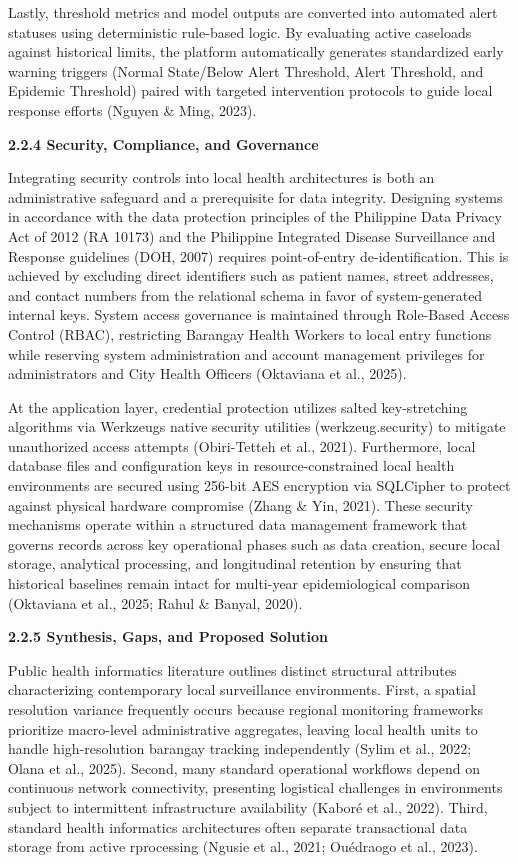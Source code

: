 \documentclass[
]{article}
\begin{document}
Lastly, threshold metrics and model outputs are converted into automated
alert statuses using deterministic rule-based logic. By evaluating
active caseloads against historical limits, the platform automatically
generates standardized early warning triggers (Normal State/Below Alert
Threshold, Alert Threshold, and Epidemic Threshold) paired with targeted
intervention protocols to guide local response efforts (Nguyen \& Ming,
2023).

\textbf{2.2.4 Security, Compliance, and Governance}

Integrating security controls into local health architectures is both an
administrative safeguard and a prerequisite for data integrity.
Designing systems in accordance with the data protection principles of
the Philippine Data Privacy Act of 2012 (RA 10173) and the Philippine
Integrated Disease Surveillance and Response guidelines (DOH, 2007)
requires point-of-entry de-identification. This is achieved by excluding
direct identifiers such as patient names, street addresses, and contact
numbers from the relational schema in favor of system-generated internal
keys. System access governance is maintained through Role-Based Access
Control (RBAC), restricting Barangay Health Workers to local entry
functions while reserving system administration and account management
privileges for administrators and City Health Officers (Oktaviana et
al., 2025).

At the application layer, credential protection utilizes salted
key-stretching algorithms via Werkzeug\textquotesingle s native security
utilities (werkzeug.security) to mitigate unauthorized access attempts
(Obiri-Tetteh et al., 2021). Furthermore, local database files and
configuration keys in resource-constrained local health environments are
secured using 256-bit AES encryption via SQLCipher to protect against
physical hardware compromise (Zhang \& Yin, 2021). These security
mechanisms operate within a structured data management framework that
governs records across key operational phases such as data creation,
secure local storage, analytical processing, and longitudinal retention
by ensuring that historical baselines remain intact for multi-year
epidemiological comparison (Oktaviana et al., 2025; Rahul \& Banyal,
2020).

\textbf{2.2.5 Synthesis, Gaps, and Proposed Solution}

Public health informatics literature outlines distinct structural
attributes characterizing contemporary local surveillance environments.
First, a spatial resolution variance frequently occurs because regional
monitoring frameworks prioritize macro-level administrative aggregates,
leaving local health units to handle high-resolution barangay tracking
independently (Sylim et al., 2022; Olana et al., 2025). Second, many
standard operational workflows depend on continuous network
connectivity, presenting logistical challenges in environments subject
to intermittent infrastructure availability (Kaboré et al., 2022).
Third, standard health informatics architectures often separate
transactional data storage from active rprocessing (Ngusie et al., 2021;
Ouédraogo et al., 2023).
\end{document}
